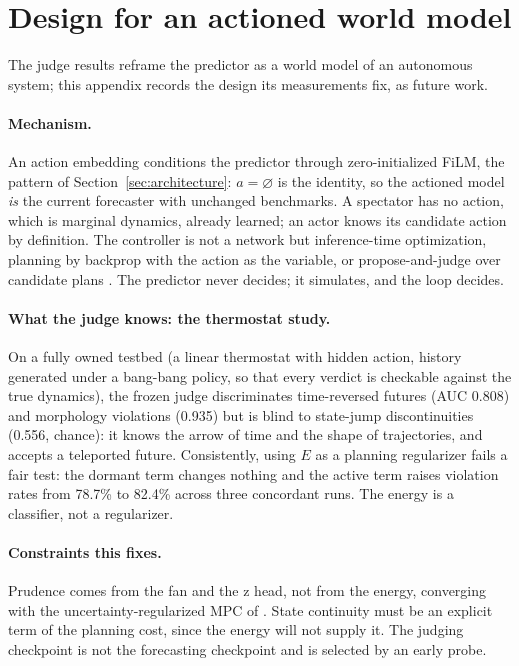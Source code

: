 \section{Design for an actioned world model}
\label{app:worldmodel}

The judge results reframe the predictor as a world model of an autonomous
system; this appendix records the design its measurements fix, as future
work.

\paragraph{Mechanism.}
An action embedding conditions the predictor through zero-initialized
FiLM, the pattern of Section~\ref{sec:architecture}: $a = \varnothing$ is
the identity, so the actioned model \emph{is} the current forecaster with
unchanged benchmarks. A spectator has no action, which is marginal
dynamics, already learned; an actor knows its candidate action by
definition. The controller is not a network but inference-time
optimization, planning by backprop with the action as the variable, or
propose-and-judge over candidate plans
\citep{williams2017mppi,hansen2024tdmpc2}. The predictor never decides;
it simulates, and the loop decides.

\paragraph{What the judge knows: the thermostat study.}
On a fully owned testbed (a linear thermostat with hidden action,
history generated under a bang-bang policy, so that every verdict is
checkable against the true dynamics), the frozen judge discriminates
time-reversed futures (AUC 0.808) and morphology violations (0.935) but
is blind to state-jump discontinuities (0.556, chance): it knows the
arrow of time and the shape of trajectories, and accepts a teleported
future. Consistently, using $E$ as a planning regularizer fails a fair
test: the dormant term changes nothing and the active term raises
violation rates from 78.7\% to 82.4\% across three concordant runs. The
energy is a classifier, not a regularizer.

\paragraph{Constraints this fixes.}
Prudence comes from the fan and the z head, not from the energy,
converging with the uncertainty-regularized MPC of
\citet{henaff2019mpur}. State continuity must be an explicit term of the
planning cost, since the energy will not supply it. The judging
checkpoint is not the forecasting checkpoint and is selected by an early
probe.

